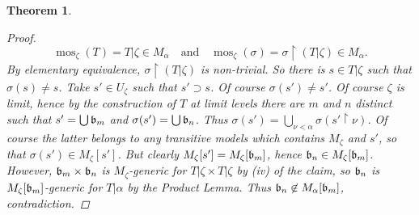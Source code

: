 \documentclass[11pt,a4paper]{report}
\newtheorem{theorem}{Theorem}[chapter] %
\theoremstyle{definition}
\theoremstyle{num.custom-title}
\theoremstyle{custom-title}
\DeclareMathOperator{\restr}{\upharpoonright}
\DeclareMathOperator{\mos}{mos}
\begin{document}
\begin{theorem}
\begin{proof}
\[
\mos_\zeta(T) = T|\zeta \in M_\alpha \quad \text{and} \quad \mos_\zeta(\sigma) = \sigma \restr (T|\zeta) \in M_\alpha.
\]
By elementary equivalence, $\sigma \restr (T|\zeta)$ is non-trivial. So there is $s \in T|\zeta$ such that $\sigma(s) \neq s$. Take $s' \in U_\zeta$ such that $s' \supset s$. Of course $\sigma(s') \neq s'$. Of course $\zeta$ is limit, hence by the construction of $T$ at limit levels there are $m$ and $n$ distinct such that $s' = \bigcup \mathfrak{b}_m$ and $\sigma(s') = \bigcup \mathfrak{b}_n$. Thus $\sigma(s') = \bigcup_{\nu < \alpha} \sigma(s' \restr \nu)$. Of course the latter belongs to any transitive models which contains $M_\zeta$ and $s'$, so that $\sigma(s') \in M_\zeta[s']$. But clearly $M_\zeta[s'] = M_\zeta[\mathfrak{b}_m]$, hence $\mathfrak{b}_n \in M_\zeta[\mathfrak{b}_m]$. However, $\mathfrak{b}_m \times \mathfrak{b}_n$ is $M_\zeta$-generic for $T|\zeta \times T|\zeta$ by (iv) of the claim, so $\mathfrak{b}_n$ is $M_\zeta[\mathfrak{b}_m]$-generic for $T|\alpha$ by the Product Lemma. Thus $\mathfrak{b}_n \not\in M_\alpha[\mathfrak{b}_m]$, contradiction.
\end{proof}
\end{theorem}
\end{document}
